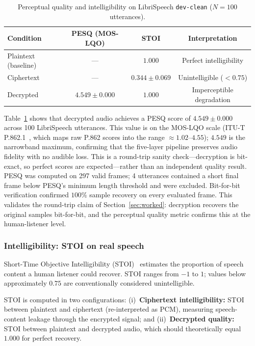 \documentclass[pdflatex,sn-mathphys-num]{sn-jnl}%
\theoremstyle{thmstyleone}%
\theoremstyle{thmstyletwo}%
\theoremstyle{thmstylethree}%
\begin{document}
\begin{table}[htbp]
\centering
\caption{Perceptual quality and intelligibility on LibriSpeech \texttt{dev-clean} ($N=100$ utterances).}
\label{tab:perceptual}
\begin{tabular}{@{}lccc@{}}
\toprule
Condition & PESQ (MOS-LQO) & STOI & Interpretation \\
\midrule
Plaintext (baseline) & --- & $1.000$ & Perfect intelligibility \\
Ciphertext & --- & $\mathbf{0.344 \pm 0.069}$ & Unintelligible ($<0.75$) \\
Decrypted & $\mathbf{4.549 \pm 0.000}$ & $1.000$ & Imperceptible degradation \\
\bottomrule
\end{tabular}
\end{table}

Table~\ref{tab:perceptual} shows that decrypted audio achieves a PESQ score
of $4.549 \pm 0.000$ across 100 LibriSpeech utterances. This value is on the
MOS-LQO scale (ITU-T P.862.1~\cite{itup8621}, which maps raw P.862 scores into
the range $\approx1.02$--$4.55$); $4.549$ is the narrowband maximum, confirming that the
five-layer pipeline preserves audio fidelity with no audible loss. This is a
round-trip sanity check---decryption is bit-exact, so perfect scores are
expected---rather than an independent quality result. PESQ was computed 
on 297 valid frames; 4 utterances contained a short final frame below 
PESQ's minimum length threshold and were excluded. Bit-for-bit verification 
confirmed $100\%$ sample recovery on every evaluated frame. This validates 
the round-trip claim of Section~\ref{sec:worked}: decryption 
recovers the original samples bit-for-bit, and the perceptual quality metric 
confirms this at the human-listener level.

\subsubsection{Intelligibility: STOI on real speech}
Short-Time Objective Intelligibility (STOI)~\cite{taal2011} estimates the proportion of speech content a human listener could recover. STOI ranges from $-1$ to $1$; values below approximately $0.75$ are conventionally considered unintelligible.

STOI is computed in two configurations: (i)~\textbf{Ciphertext intelligibility:} STOI between plaintext and ciphertext (re-interpreted as PCM), measuring speech-content leakage through the encrypted signal; and (ii)~\textbf{Decrypted quality:} STOI between plaintext and decrypted audio, which should theoretically equal $1.000$ for perfect recovery.
\end{document}
